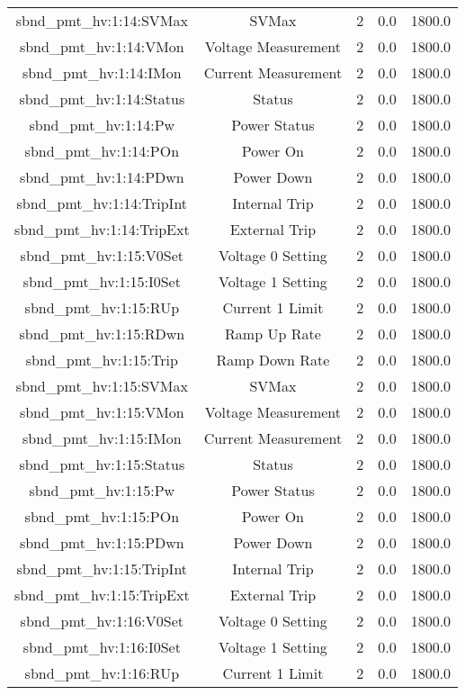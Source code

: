 \begin{table}[ptb]
\begin{tabular}{c | c c c c}
sbnd_pmt_hv:1:14:SVMax & SVMax & 2 & 0.0 & 1800.0\\ 
sbnd_pmt_hv:1:14:VMon & Voltage Measurement & 2 & 0.0 & 1800.0\\ 
sbnd_pmt_hv:1:14:IMon & Current Measurement & 2 & 0.0 & 1800.0\\ 
sbnd_pmt_hv:1:14:Status & Status & 2 & 0.0 & 1800.0\\ 
sbnd_pmt_hv:1:14:Pw & Power Status & 2 & 0.0 & 1800.0\\ 
sbnd_pmt_hv:1:14:POn & Power On & 2 & 0.0 & 1800.0\\ 
sbnd_pmt_hv:1:14:PDwn & Power Down & 2 & 0.0 & 1800.0\\ 
sbnd_pmt_hv:1:14:TripInt & Internal Trip & 2 & 0.0 & 1800.0\\ 
sbnd_pmt_hv:1:14:TripExt & External Trip & 2 & 0.0 & 1800.0\\ 
sbnd_pmt_hv:1:15:V0Set & Voltage 0 Setting & 2 & 0.0 & 1800.0\\ 
sbnd_pmt_hv:1:15:I0Set & Voltage 1 Setting & 2 & 0.0 & 1800.0\\ 
sbnd_pmt_hv:1:15:RUp & Current 1 Limit & 2 & 0.0 & 1800.0\\ 
sbnd_pmt_hv:1:15:RDwn & Ramp Up Rate & 2 & 0.0 & 1800.0\\ 
sbnd_pmt_hv:1:15:Trip & Ramp Down Rate & 2 & 0.0 & 1800.0\\ 
sbnd_pmt_hv:1:15:SVMax & SVMax & 2 & 0.0 & 1800.0\\ 
sbnd_pmt_hv:1:15:VMon & Voltage Measurement & 2 & 0.0 & 1800.0\\ 
sbnd_pmt_hv:1:15:IMon & Current Measurement & 2 & 0.0 & 1800.0\\ 
sbnd_pmt_hv:1:15:Status & Status & 2 & 0.0 & 1800.0\\ 
sbnd_pmt_hv:1:15:Pw & Power Status & 2 & 0.0 & 1800.0\\ 
sbnd_pmt_hv:1:15:POn & Power On & 2 & 0.0 & 1800.0\\ 
sbnd_pmt_hv:1:15:PDwn & Power Down & 2 & 0.0 & 1800.0\\ 
sbnd_pmt_hv:1:15:TripInt & Internal Trip & 2 & 0.0 & 1800.0\\ 
sbnd_pmt_hv:1:15:TripExt & External Trip & 2 & 0.0 & 1800.0\\ 
sbnd_pmt_hv:1:16:V0Set & Voltage 0 Setting & 2 & 0.0 & 1800.0\\ 
sbnd_pmt_hv:1:16:I0Set & Voltage 1 Setting & 2 & 0.0 & 1800.0\\ 
sbnd_pmt_hv:1:16:RUp & Current 1 Limit & 2 & 0.0 & 1800.0\\ 

\end{tabular}
\end{table}

